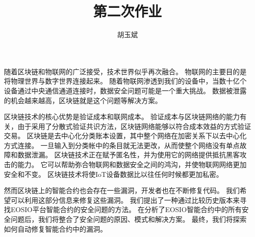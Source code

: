 \documentclass[onecolumn,oneside]{BUPTHomework}
\author{胡玉斌}
\title{第二次作业}
\begin{document}
  \maketitle
  
随着区块链和物联网的广泛接受，技术世界似乎再次融合。
物联网的主要目的是将物理世界与数字世界连接起来。
随着物联网渗透到我们的设备中，当数十亿个设备通过中央通信通道连接时，数据安全问题可能是一个重大挑战。
数据被泄露的机会越来越高，区块链就是这个问题等解决方案。

区块链技术的核心优势是验证成本和联网成本。
验证成本与区块链网络的能力有关，由于采用了分散式验证共识方法，区块链网络能够以符合成本效益的方式验证交易。
区块链是去中心化分类账本设置，其中整个网络在加密关系下以去中心化方式连接。
一旦输入到分类帐中的条目就无法更改，从而使整个网络没有单点故障和数据泄漏。
区块链技术正在赋予匿名性，并为使用它的网络提供抵抗黑客攻击的能力。
它可以帮助弥合物联网和数据安全之间的鸿沟，并使物联网网络更加安全和不变。
区块链技术将使IoT设备数据比以往任何时候都更加私密。

然而区块链上的智能合约也会存在一些漏洞，开发者也在不断修复代码。
我们希望可以利用这部分信息来修复这些漏洞。
我们提出了一种通过比较历史版本来寻找EOSIO平台智能合约的安全问题的方法。
在分析了EOSIO智能合约中的所有安全问题后，我们将整合了安全问题的原因、模式和解决方案。
最终，我们将探索如何自动修复智能合约中的漏洞。
\end{document}
